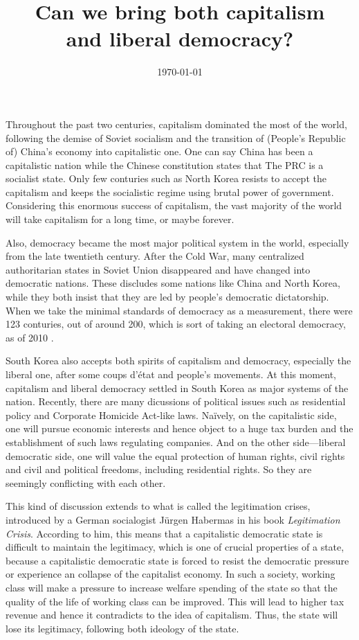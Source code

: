\documentclass{homework}
\title{\LARGE Can we bring both capitalism\\[.3em] and liberal democracy?}
\date{\today}
\begin{document}
\maketitle


Throughout the past two centuries, capitalism dominated the most of the world, following the demise of Soviet socialism and the transition of (People's Republic of) China's economy into capitalistic one. One can say China has been a capitalistic nation while the Chinese constitution states that The PRC is a socialist state. Only few conturies such as North Korea resists to accept the capitalism and keeps the socialistic regime using brutal power of government. Considering this enormous success of capitalism, the vast majority of the world will take capitalism for a long time, or maybe forever.

Also, democracy became the most major political system in the world, especially from the late twentieth century. After the Cold War, many centralized authoritarian states in Soviet Union disappeared and have changed into democratic nations. These discludes some nations like China and North Korea, while they both insist that they are led by people's democratic dictatorship. When we take the minimal standards of democracy as a measurement, there were 123 conturies, out of around 200, which is sort of taking an electoral democracy, as of 2010 \cite{FreedomHouse2010}.

South Korea also accepts both spirits of capitalism and democracy, especially the liberal one, after some coups d'\'etat and people's movements. At this moment, capitalism and liberal democracy settled in South Korea as major systems of the nation. Recently, there are many dicussions of political issues such as residential policy and Corporate Homicide Act-like laws. Na\"ively, on the capitalistic side, one will pursue economic interests and hence object to a huge tax burden and the establishment of such laws regulating companies. And on the other side---liberal democratic side, one will value the equal protection of human rights, civil rights and civil and political freedoms, including residential rights. So they are seemingly conflicting with each other.

This kind of discussion extends to what is called the legitimation crises, introduced by a German socialogist J\"urgen Habermas in his book \textit{Legitimation Crisis}. According to him, this means that a capitalistic democratic state is difficult to maintain the legitimacy, which is one of crucial properties of a state, because a capitalistic democratic state is forced to resist the democratic pressure or experience an collapse of the capitalist economy. In such a society, working class will make a pressure to increase welfare spending of the state so that the quality of the life of working class can be improved. This will lead to higher tax revenue and hence it contradicts to the idea of capitalism. Thus, the state will lose its legitimacy, following both ideology of the state.
\end{document}
